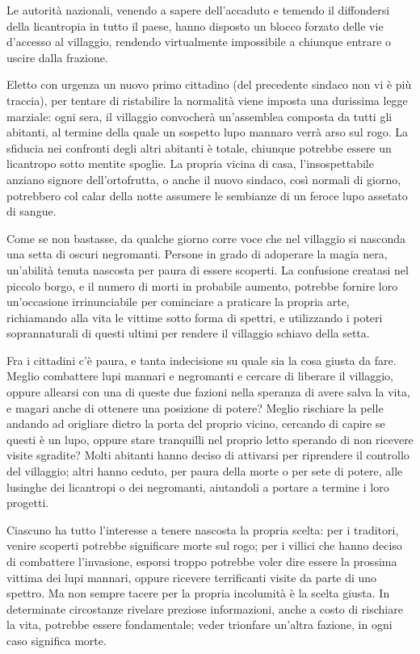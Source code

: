 \documentclass[a4paper,10pt]{article}
\begin{document}
Le autorità nazionali, venendo a sapere dell'accaduto e temendo il diffondersi della licantropia in tutto il paese, hanno disposto un blocco forzato delle vie d'accesso al villaggio, rendendo virtualmente impossibile a chiunque entrare o uscire dalla frazione.

Eletto con urgenza un nuovo primo cittadino (del precedente sindaco non vi è più traccia), per tentare di ristabilire la normalità viene imposta una durissima legge marziale: ogni sera, il villaggio convocherà un'assemblea composta da tutti gli abitanti, al termine della quale un sospetto lupo mannaro verrà arso sul rogo. La sfiducia nei confronti degli altri abitanti è totale, chiunque potrebbe essere un licantropo sotto mentite spoglie. La propria vicina di casa, l'insospettabile anziano signore dell'ortofrutta, o anche il nuovo sindaco, così normali di giorno, potrebbero col calar della notte assumere le sembianze di un feroce lupo assetato di sangue.

Come se non bastasse, da qualche giorno corre voce che nel villaggio si nasconda una setta di oscuri negromanti. Persone in grado di adoperare la magia nera, un'abilità tenuta nascosta per paura di essere scoperti. La confusione creatasi nel piccolo borgo, e il numero di morti in probabile aumento, potrebbe fornire loro un'occasione irrinunciabile per cominciare a praticare la propria arte, richiamando alla vita le vittime sotto forma di spettri, e utilizzando i poteri soprannaturali di questi ultimi per rendere il villaggio schiavo della setta.

Fra i cittadini c'è paura, e tanta indecisione su quale sia la cosa giusta da fare. Meglio combattere lupi mannari e negromanti e cercare di liberare il villaggio, oppure allearsi con una di queste due fazioni nella speranza di avere salva la vita, e magari anche di ottenere una posizione di potere? Meglio rischiare la pelle andando ad origliare dietro la porta del proprio vicino, cercando di capire se questi è un lupo, oppure stare tranquilli nel proprio letto sperando di non ricevere visite sgradite? Molti abitanti hanno deciso di attivarsi per riprendere il controllo del villaggio; altri hanno ceduto, per paura della morte o per sete di potere, alle lusinghe dei licantropi o dei negromanti, aiutandoli a portare a termine i loro progetti.

Ciascuno ha tutto l'interesse a tenere nascosta la propria scelta: per i traditori, venire scoperti potrebbe significare morte sul rogo; per i villici che hanno deciso di combattere l'invasione, esporsi troppo potrebbe voler dire essere la prossima vittima dei lupi mannari, oppure ricevere terrificanti visite da parte di uno spettro. Ma non sempre tacere per la propria incolumità è la scelta giusta. In determinate circostanze rivelare preziose informazioni, anche a costo di rischiare la vita, potrebbe essere fondamentale; veder trionfare un'altra fazione, in ogni caso significa morte.
\end{document}
